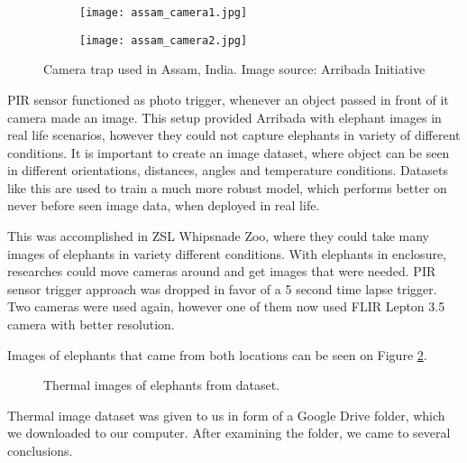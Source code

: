 \begin{figure}[ht]
    \begin{subfigure}{0.5\textwidth}
        \centering
        \texttt{[image: assam\_camera1.jpg]} 
    \end{subfigure}
    \begin{subfigure}{0.5\textwidth}
        \centering
        \texttt{[image: assam\_camera2.jpg]}
    \end{subfigure}
    \caption{Camera trap used in Assam, India. Image source: Arribada Initiative \cite{arribada-assam}}
    \label{assam_camera}
\end{figure}

PIR sensor functioned as photo trigger, whenever an object passed in front of it camera made an image.
This setup provided Arribada with elephant images in real life scenarios, however they could not capture elephants in variety of different conditions. 
It is important to create an image dataset, where object can be seen in different orientations, distances, angles and temperature conditions.
Datasets like this are used to train a much more robust model, which performs better on never before seen image data, when deployed in real life.

This was accomplished in ZSL Whipsnade Zoo, where they could take many images of elephants in variety different conditions\cite{dataset_collection}.
With elephants in enclosure, researches could move cameras around and get images that were needed.
PIR sensor trigger approach was dropped in favor of a 5 second time lapse trigger.
Two cameras were used again, however one of them now used FLIR Lepton 3.5 camera with better resolution.

Images of elephants that came from both locations can be seen on Figure \ref{four_elephants}.

\begin{figure}[ht]
    \centering
    \caption{Thermal images of elephants from dataset.}
    \label{four_elephants}
\end{figure}

Thermal image dataset was given to us in form of a Google Drive folder, which we downloaded to our computer.
After examining the folder, we came to several conclusions.

